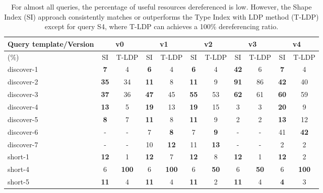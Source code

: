 \begin{table}[htbp]
	\begin{center}
		\begin{tabular}{|l|c|c|c|c|c|c|c|c|c|c|}
			\hline
            \multicolumn{1}{|c}{Query template/Version} & \multicolumn{2}{|c|}{v0} & \multicolumn{2}{|c|}{v1} & \multicolumn{2}{|c|}{v2} & \multicolumn{2}{|c|}{v3} & \multicolumn{2}{|c|}{v4} \\
			\hline
            (\%) & SI  & T-LDP & SI & T-LDP & SI & T-LDP& SI & T-LDP & SI & T-LDP \\
            \hline
			discover-1 & \textbf{7} & 4 & \textbf{6} & 4 & \textbf{6} & 4 & \textbf{42} & 6 & \textbf{7} & 4 \\
            \hline
            discover-2 & \textbf{35} & 34 & \textbf{11} & 8 & \textbf{11} & 9 & \textbf{91} & 86 & \textbf{42} & 40 \\
			\hline
            discover-3 & \textbf{37} & 36 & \textbf{47} & 45 & \textbf{55} & 53 & \textbf{62} & 61 & \textbf{60} & 59 \\
			\hline
            discover-4 & \textbf{13} & 5 & \textbf{19} & 13 & \textbf{19} & 15 & 3 & 3 & \textbf{20} & 9 \\
			\hline
            discover-5 & \textbf{8} & 7 & \textbf{11} & 8 & \textbf{11} & 9 & 2 & 2 & \textbf{13} & 12 \\
			\hline
            discover-6 & - & - & 7 & \textbf{8} & 7 & \textbf{9} & - & - & 41 & \textbf{42} \\
			\hline
            discover-7 & - & - & 10 & \textbf{12} & 11 & \textbf{13} & - & - & 2 & 2 \\
			\hline
            short-1 & \textbf{12} & 1 & \textbf{12} & 7 & \textbf{12} & 8 & \textbf{12} & 1 & \textbf{12} & 2 \\
			\hline
            short-4 & 6 & \textbf{100} & 6 & \textbf{100} & 6 & \textbf{50} & 6 & \textbf{50} & 6 & \textbf{100} \\
			\hline
            short-5 & \textbf{11} & 4 & \textbf{11} & 4 & \textbf{11} & 2 & \textbf{11} & 4 & \textbf{4} & 3 \\
			\hline
		\end{tabular}
	\end{center}
	\caption{
        For almost all queries, the percentage of useful resources dereferenced is low. 
        However, the Shape Index (SI) approach consistently matches or outperforms the Type Index with LDP method (T-LDP) except for query S4, where T-LDP can achieves a 100\% dereferencing ratio.
        }
	\label{tab:ratioUsefulResources}
\end{table}